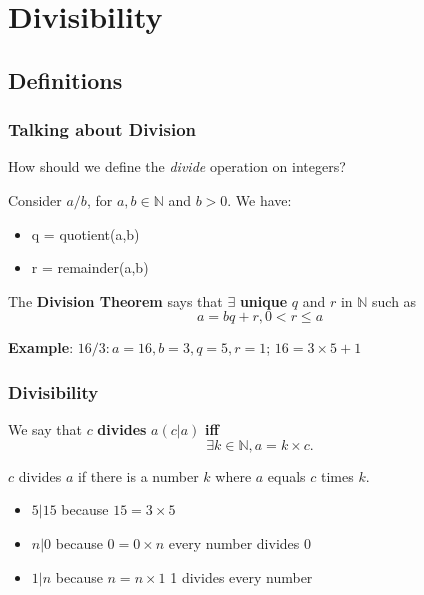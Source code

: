 \section{Divisibility}


\subsection{Definitions}

\begin{frame}
  \frametitle{Talking about Division}

  How should we define the \emph{divide} operation on integers?\bigskip

  Consider $a/b$, for $a,b \in \mathbb{N}$ and $b > 0$. We have:
  \bigskip

  \begin{itemize}
  \item q = quotient(a,b)
  \item r = remainder(a,b)
  \end{itemize}

  \bigskip

  The {\bf Division Theorem} says that $\exists$ {\bf unique} $q$ and $r$ in $\mathbb{N}$ such as
  \begin{equation*}
    a = bq + r, 0 < r \leq a
  \end{equation*}\bigskip

  {\bf Example}: $16/3: a = 16, b = 3, q = 5, r = 1$;\hspace{1cm} $16 = 3\times 5 + 1$

\end{frame}

\begin{frame}
  \frametitle{Divisibility}

  We say that $c$ {\bf divides} $a (c|a)$ {\bf iff}
    \begin{equation*}
      \exists k \in \mathbb{N}, a = k\times c.
    \end{equation*}
    \begin{center}
      $c$ divides $a$ if there is a number $k$ where $a$ equals $c$ times $k$.
    \end{center}

  \bigskip

  \begin{itemize}
  \item $5 | 15$ because $15 = 3 \times 5$
  \item $n | 0$ because $0 = 0 \times n$ \hspace{1cm} every number divides 0
  \item $1 | n$ because $n = n \times 1$ \hspace{1cm} 1 divides every number
  \end{itemize}
\end{frame}

